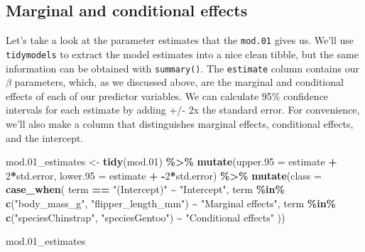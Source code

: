 \documentclass[
]{article}
\newenvironment{Shaded}{\begin{snugshade}}{\end{snugshade}}
\newcommand{\AttributeTok}[1]{\textcolor[rgb]{0.13,0.29,0.53}{#1}}
\newcommand{\DecValTok}[1]{\textcolor[rgb]{0.00,0.00,0.81}{#1}}
\newcommand{\FloatTok}[1]{\textcolor[rgb]{0.00,0.00,0.81}{#1}}
\newcommand{\FunctionTok}[1]{\textcolor[rgb]{0.13,0.29,0.53}{\textbf{#1}}}
\newcommand{\NormalTok}[1]{#1}
\newcommand{\OtherTok}[1]{\textcolor[rgb]{0.56,0.35,0.01}{#1}}
\newcommand{\SpecialCharTok}[1]{\textcolor[rgb]{0.81,0.36,0.00}{\textbf{#1}}}
\newcommand{\StringTok}[1]{\textcolor[rgb]{0.31,0.60,0.02}{#1}}
\begin{document}
\hypertarget{marginal-and-conditional-effects}{%
\subsection{Marginal and conditional
effects}\label{marginal-and-conditional-effects}}

Let's take a look at the parameter estimates that the \texttt{mod.01}
gives us. We'll use \texttt{tidymodels} to extract the model estimates
into a nice clean tibble, but the same information can be obtained with
\texttt{summary()}. The \texttt{estimate} column contains our \(\beta\)
parameters, which, as we discussed above, are the marginal and
conditional effects of each of our predictor variables. We can calculate
95\% confidence intervals for each estimate by adding +/- 2x the
standard error. For convenience, we'll also make a column that
distinguishes marginal effects, conditional effects, and the intercept.

\begin{Shaded}
\begin{Highlighting}[]
\NormalTok{mod}\FloatTok{.01}\NormalTok{\_estimates }\OtherTok{\textless{}{-}} \FunctionTok{tidy}\NormalTok{(mod}\FloatTok{.01}\NormalTok{) }\SpecialCharTok{\%\textgreater{}\%}
  \FunctionTok{mutate}\NormalTok{(}\AttributeTok{upper.95 =}\NormalTok{ estimate }\SpecialCharTok{+} \DecValTok{2}\SpecialCharTok{*}\NormalTok{std.error,}
         \AttributeTok{lower.95 =}\NormalTok{ estimate }\SpecialCharTok{+} \SpecialCharTok{{-}}\DecValTok{2}\SpecialCharTok{*}\NormalTok{std.error) }\SpecialCharTok{\%\textgreater{}\%}
  \FunctionTok{mutate}\NormalTok{(}\AttributeTok{class =} \FunctionTok{case\_when}\NormalTok{(}
\NormalTok{    term }\SpecialCharTok{==} \StringTok{"(Intercept)"} \SpecialCharTok{\textasciitilde{}} \StringTok{"Intercept"}\NormalTok{,}
\NormalTok{    term }\SpecialCharTok{\%in\%} \FunctionTok{c}\NormalTok{(}\StringTok{"body\_mass\_g"}\NormalTok{, }\StringTok{"flipper\_length\_mm"}\NormalTok{) }\SpecialCharTok{\textasciitilde{}} \StringTok{"Marginal effects"}\NormalTok{,}
\NormalTok{    term }\SpecialCharTok{\%in\%} \FunctionTok{c}\NormalTok{(}\StringTok{"speciesChinstrap"}\NormalTok{, }\StringTok{"speciesGentoo"}\NormalTok{) }\SpecialCharTok{\textasciitilde{}} \StringTok{"Conditional effects"}
\NormalTok{  ))}

\NormalTok{mod}\FloatTok{.01}\NormalTok{\_estimates}
\end{Highlighting}
\end{Shaded}
\end{document}
